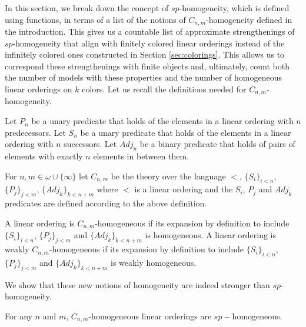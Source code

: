 \documentclass[11pt]{amsart}
\theoremstyle{definition}
\begin{document}
In this section, we break down the concept of $sp$-homogeneity, which is defined using functions, in terms of a list of the notions of $C_{n,m}$-homogeneity defined in the introduction.
This gives us a countable list of approximate strengthenings of $sp$-homogeneity that align with finitely colored linear orderings instead of the infinitely colored ones constructed in Section \ref{sec:colorings}.
This allows us to correspond these strengthenings with finite objects and, ultimately, count both the number of models with these properties and the number of homogeneous linear orderings on $k$ colors.
Let us recall the definitions needed for $C_{n,m}$-homogeneity.

\begin{definition}
    Let $P_n$ be a unary predicate that holds of the elements in a linear ordering with $n$ predecessors.
    Let $S_n$ be a unary predicate that holds of the elements in a linear ordering with $n$ successors.
    Let $Adj_n$ be a binary predicate that holds of pairs of elements with exactly $n$ elements in between them.
\end{definition}


\begin{definition}
    For $n,m\in\omega\cup\{\infty\}$ let $C_{n,m}$ be the theory over the language $<$, $\{S_i\}_{i<n}$, $\{P_j\}_{j<m}$, $\{Adj_k\}_{k<n+m}$ where $<$ is a linear ordering and the $S_i$, $P_j$ and $Adj_k$ predicates are defined according to the above definition.
\end{definition}

\begin{definition}
    A linear ordering is $C_{n,m}$-homogeneous if its expansion by definition to include $\{S_i\}_{i<n}$, $\{P_j\}_{j<m}$ and $\{Adj_k\}_{k<n+m}$ is homogeneous.
    A linear ordering is weakly $C_{n,m}$-homogeneous if its expansion by definition to include $\{S_i\}_{i<n}$, $\{P_j\}_{j<m}$ and $\{Adj_k\}_{k<n+m}$ is weakly homogeneous.
\end{definition}

We show that these new notions of homogeneity are indeed stronger than $sp$-homogeneity.

\begin{lemma}\label{lem:homogeneitytransfer}
    For any $n$ and $m$, $C_{n,m}$-homogeneous linear orderings are $sp-$homogeneous.
\end{lemma}
\end{document}
